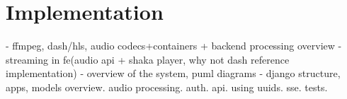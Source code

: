 \chapter{Implementation}
- ffmpeg, dash/hls, audio codecs+containers + backend processing overview
- streaming in fe(audio api + shaka player, why not dash reference implementation)
- overview of the system, puml diagrams
- django structure, apps, models overview. audio processing. auth. api. using uuids. sse. tests.